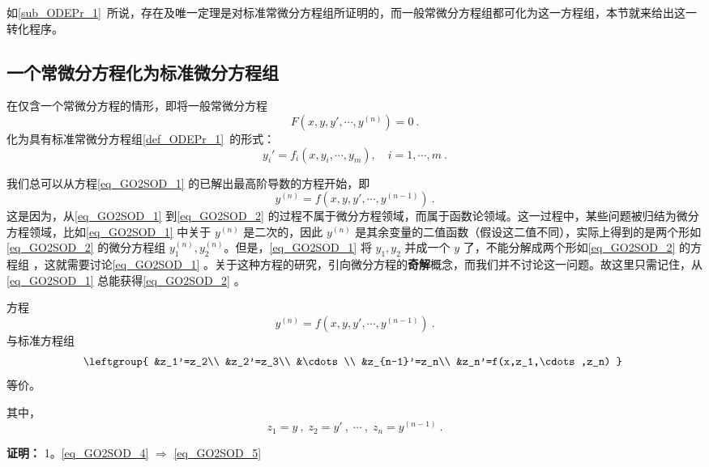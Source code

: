 
如\autoref{sub_ODEPr_1}~所说，存在及唯一定理是对标准常微分方程组所证明的，而一般常微分方程组都可化为这一方程组，本节就来给出这一转化程序。

\subsection{一个常微分方程化为标准微分方程组}
在仅含一个常微分方程的情形，即将一般常微分方程
\begin{equation}\label{eq_GO2SOD_1}
F(x,y,y',\cdots,y^{(n)})=0~.
\end{equation}
化为具有标准常微分方程组\autoref{def_ODEPr_1}~的形式：
\begin{equation}\label{eq_GO2SOD_3}
y_i'=f_i(x,y_i,\cdots,y_m),\quad i=1,\cdots,m~.
\end{equation}

我们总可以从方程\autoref{eq_GO2SOD_1} 的已解出最高阶导数的方程开始，即
\begin{equation}\label{eq_GO2SOD_2}
y^{(n)}=f(x,y,y',\cdots,y^{(n-1)})~.
\end{equation}
这是因为，从\autoref{eq_GO2SOD_1} 到\autoref{eq_GO2SOD_2} 的过程不属于微分方程领域，而属于函数论领域。这一过程中，某些问题被归结为微分方程领域，比如\autoref{eq_GO2SOD_1} 中关于 $y^{(n)}$ 是二次的，因此 $y^{(n)}$ 是其余变量的二值函数（假设这二值不同），实际上得到的是两个形如\autoref{eq_GO2SOD_2} 的微分方程组 $y_1^{(n)},y_2^{(n)}$。但是，\autoref{eq_GO2SOD_1} 将 $y_1,y_2$ 并成一个 $y$ 了，不能分解成两个形如\autoref{eq_GO2SOD_2} 的方程组 ，这就需要讨论\autoref{eq_GO2SOD_1} 。关于这种方程的研究，引向微分方程的\textbf{奇解}概念，而我们并不讨论这一问题。故这里只需记住，从\autoref{eq_GO2SOD_1} 总能获得\autoref{eq_GO2SOD_2} 。
\begin{theorem}{}\label{the_GO2SOD_1}
方程
\begin{equation}\label{eq_GO2SOD_4}
y^{(n)}=f(x,y,y',\cdots,y^{(n-1)})~.
\end{equation}
与标准方程组
\begin{equation}\label{eq_GO2SOD_5}
\leftgroup{
&z_1'=z_2\\
&z_2'=z_3\\
&\cdots\\
&z_{n-1}'=z_n\\
&z_n'=f(x,z_1,\cdots,z_n)
}~
\end{equation}
等价。

其中，
\begin{equation}\label{eq_GO2SOD_6}
z_1=y~,\;z_2=y'~,\;\cdots~,\;z_n=y^{(n-1)}~.
\end{equation}
\end{theorem}
\textbf{证明：}
1。\autoref{eq_GO2SOD_4} $\Rightarrow$ \autoref{eq_GO2SOD_5} 

